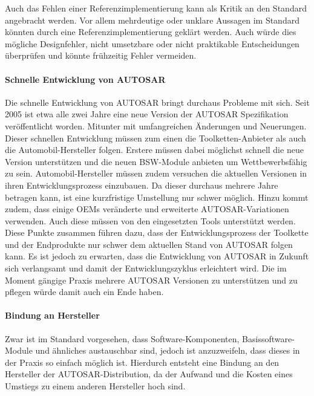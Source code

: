 \documentclass[
  a4paper,					    %
  twoside,
  DIV=calc,     				%
  bibliography=totoc,
  cleardoublepage=empty,
  ngerman,     					%
  final       					%
]{scrbook}
\begin{document}
Auch das Fehlen einer Referenzimplementierung kann als Kritik an den Standard angebracht werden.\cite{Hoffmann200803} Vor allem mehrdeutige oder unklare Aussagen im Standard könnten durch eine Referenzimplementierung geklärt werden. Auch würde dies mögliche Designfehler, nicht umsetzbare oder nicht praktikable Entscheidungen überprüfen und könnte frühzeitig Fehler vermeiden.\cite{testing} 

\paragraph{Schnelle Entwicklung von AUTOSAR}
Die schnelle Entwicklung von AUTOSAR bringt durchaus Probleme mit sich. Seit 2005 ist etwa alle zwei Jahre eine neue Version der AUTOSAR Spezifikation veröffentlicht worden. Mitunter mit umfangreichen Änderungen und Neuerungen. Dieser schnellen Entwicklung müssen zum einen die Toolketten-Anbieter als auch die Automobil-Hersteller folgen. Erstere müssen dabei möglichst schnell die neue Version unterstützen und die neuen BSW-Module anbieten um Wettbewerbsfähig zu sein. Automobil-Hersteller müssen zudem versuchen die aktuellen Versionen in ihren Entwicklungsprozess einzubauen. Da dieser durchaus mehrere Jahre betragen kann, ist eine kurzfristige Umstellung nur schwer möglich. Hinzu kommt zudem, dass einige OEMs veränderte und erweiterte AUTOSAR-Variationen verwenden. Auch diese müssen von den eingesetzten Tools unterstützt werden. Diese Punkte zusammen führen dazu, dass der Entwicklungsprozess der Toolkette und der Endprodukte nur schwer dem aktuellen Stand von AUTOSAR folgen kann. Es ist jedoch zu erwarten, dass die Entwicklung von AUTOSAR in Zukunft sich verlangsamt und damit der Entwicklungszyklus erleichtert wird. Die im Moment gängige Praxis mehrere AUTOSAR Versionen zu unterstützen und zu pflegen würde damit auch ein Ende haben.\cite[Seite 179]{SE_Autosar}\cite{as_kritik}

\paragraph{Bindung an Hersteller}
Zwar ist im Standard vorgesehen, dass Soft\-ware-Kom\-po\-nen\-ten, Basissoftware-Module und ähnliches austauschbar sind, jedoch ist anzuzweifeln, dass dieses in der Praxis so einfach möglich ist. Hierdurch entsteht eine Bindung an den Hersteller der AUTOSAR-Distribution, da der Aufwand und die Kosten eines Umstiegs zu einem anderen Hersteller hoch sind.\cite{as_kritik}
\end{document}
